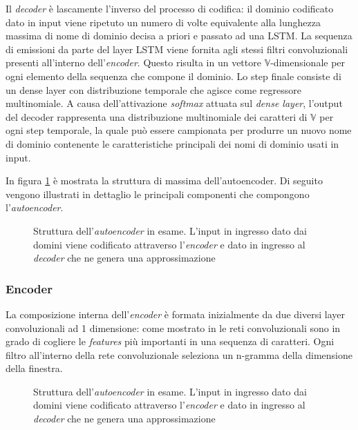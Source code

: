 Il \textit{decoder} è lascamente l'inverso del processo di codifica: il dominio codificato dato in input viene ripetuto un numero di volte equivalente alla lunghezza massima di nome di dominio decisa a priori e passato ad una LSTM. La sequenza di emissioni da parte del layer LSTM viene fornita agli stessi filtri convoluzionali presenti all'interno dell'\textit{encoder}. Questo risulta in un vettore $\mathbb{V}$-dimensionale per ogni elemento della sequenza che compone il dominio.
Lo step finale consiste di un dense layer con distribuzione temporale che agisce come regressore multinomiale. A causa dell'attivazione \textit{softmax} attuata sul \textit{dense layer}, l'output del decoder rappresenta una distribuzione multinomiale dei caratteri di $\mathbb{V}$ per ogni step temporale, la quale può essere campionata per produrre un nuovo nome di dominio contenente le caratteristiche principali dei nomi di dominio usati in input.

In figura \ref{fig:autoencoder1} è mostrata la struttura di massima dell'autoencoder. Di seguito vengono illustrati in dettaglio le principali componenti che compongono l'\textit{autoencoder}. 

\begin{figure}[hp]
    \centering
	
	\caption{Struttura dell'\textit{autoencoder} in esame. L'input in ingresso dato dai domini viene codificato attraverso l'\textit{encoder} e dato in ingresso al \textit{decoder} che ne genera una approssimazione}
\label{fig:autoencoder1}
\end{figure}

\subsubsection{Encoder}
La composizione interna dell'\textit{encoder} è formata inizialmente da due diversi layer convoluzionali ad 1 dimensione: come mostrato in \cite{1508.06615} le reti convoluzionali sono in grado di cogliere le \textit{features} più importanti in una sequenza di caratteri. Ogni filtro all'interno della rete convoluzionale seleziona un n-gramma della dimensione della finestra.

\begin{figure}[htb]
    \centering
	
	\caption{Struttura dell'\textit{autoencoder} in esame. L'input in ingresso dato dai domini viene codificato attraverso l'\textit{encoder} e dato in ingresso al \textit{decoder} che ne genera una approssimazione}
\label{fig:encoder}
\end{figure}

